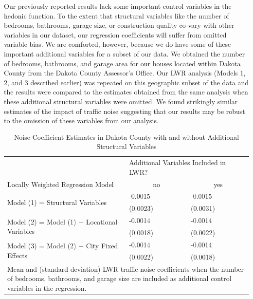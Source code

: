\documentclass{article}\usepackage[]{graphicx}\usepackage[]{color}
\begin{document}
Our previously reported results lack some important control variables in the hedonic function. To the extent that structural variables like the number of bedrooms, bathrooms, garage size, or construction quality co-vary with other variables in our dataset, our regression coefficients will suffer from omitted variable bias. We are comforted, however, because we do have some of these important additional variables for a subset of our data. We obtained the number of bedrooms, bathrooms, and garage area for our houses located within Dakota County from the Dakota County Assessor's Office. Our LWR analysis (Models 1, 2, and 3 described earlier) was repeated on this geographic subset of the data and the results were compared to the estimates obtained from the same analysis when these additional structural variables were omitted. We found strikingly similar estimates of the impact of traffic noise suggesting that our results may be robust to the omission of these variables from our analysis.

\begin{table}
\begin{center}
\caption{Noise Coefficient Estimates in Dakota County with and without Additional Structural Variables}\label{tab:Dak}
\begin{tabular}{lll}
 & \multicolumn{2}{p{1.25in}}{Additional Variables Included in LWR?} \\
Locally Weighted Regression Model & \multicolumn{1}{c}{no} & \multicolumn{1}{c}{yes} \\ \cline{1-3}
\multirow{2}{*}{Model (1) = Structural Variables} & -0.0015 & -0.0015 \\ 
   & (0.0023) & (0.0031)  \\[.2cm]
\multirow{2}{*}{Model (2) = Model (1) + Locational Variables} & -0.0014 & -0.0014  \\ 
   & (0.0018) & (0.0022)  \\[.2cm] 
\multirow{2}{*}{Model (3) = Model (2) + City Fixed Effects} & -0.0014 & -0.0014 \\ 
   & (0.0022) & (0.0018) \\[.2cm] \cline{1-3}
\multicolumn{3}{p{4.25in}}{Mean and (standard deviation) LWR traffic noise coefficients when the number of bedrooms, bathrooms, and garage size are included as additional control variables in the regression.}
\end{tabular}
\end{center}
\end{table}
\end{document}

